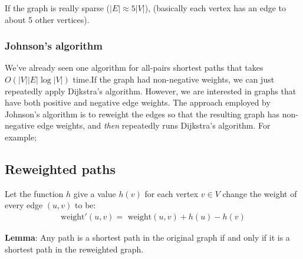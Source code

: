 \documentclass[11pt,a4paper,titlepage,dvipsnames,cmyk]{scrartcl}
\begin{document}
If the graph is really sparse ($|E| \approx 5|V|$), (basically each vertex
has an edge to about 5 other vertices). 

\subsubsection{Johnson's algorithm}%
\label{ssub:johnson's-algorithm}
We've already seen one algorithm for all-pairs shortest paths that takes
$O(|V||E|\log|V|)$ time.If the graph had non-negative weights, we can just
repeatedly apply Dijkstra's algorithm. However, we are interested in graphs
that have both positive and negative edge weights. The approach employed
by Johnson's algorithm is to reweight the edges so that the resulting
graph has non-negative edge weights, and \textit{then} repeatedly runs
Dijkstra's algorithm. For example;

\begin{center}
\end{center}


\subsection{Reweighted paths}%
\label{sub:reweighted-path}
Let the function $h$ give a value $h(v)$ for each vertex $v \in V$ change
the weight of every edge $(u,v)$ to be:
\begin{align*}
    \text{weight}'(u,v) = \text{ weight}(u,v) + h(u) - h(v)
\end{align*}

\textbf{Lemma}: Any path is a shortest path in the original graph if and
only if it is a shortest path in the reweighted graph. 
\end{document}
